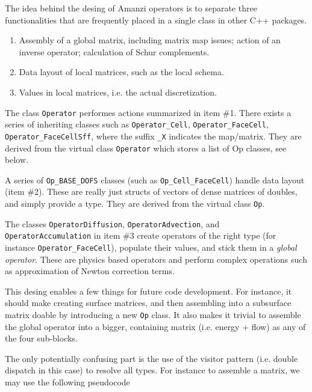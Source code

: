The idea behind the desing of Amanzi operators is to separate three 
functionalities that are frequently placed in a single class in other
C++ packages.

\begin{enumerate}
\item Assembly of a global matrix, including matrix map issues;
action of an inverse operator; calculation of Schur complements.

\item Data layout of local matrices, such as the local schema.

\item Values in local matrices, i.e. the actual discretization.
\end{enumerate}

The class {\tt Operator} performes actions summarized in item \#1. There exists
a series of inheriting classes such as {\tt Operator\_Cell}, {\tt Operator\_FaceCell}, 
{\tt Operator\_FaceCellSff}, where the suffix {\tt \_X} indicates the map/matrix.
They are derived from the virtual class {\tt Operator} which stores a list of Op classes,
see below.

A series of {\tt Op\_BASE\_DOFS} classes (such as {\tt Op\_Cell\_FaceCell})
handle data layout (item \#2). These are really just structs of vectors of
dense matrices of doubles, and simply provide a type.
They are derived from the virtual class {\tt Op}.

The classes {\tt OperatorDiffusion}, {\tt OperatorAdvection}, and {\tt OperatorAccumulation} 
in item \#3 create operators of the right type (for instance {\tt Operator\_FaceCell}), populate their 
values, and stick them in a {\it global operator}.
These are physics based operators and perform complex operations such as approximation
of Newton correction terms.

This desing enables a few things for future code development.
For instance, it should make creating surface matrices, and then assembling into a 
subsurface matrix doable by introducing a new {\tt Op} class.  
It also makes it trivial to assemble the global operator into a bigger, containing 
matrix (i.e. energy + flow) as any of the four sub-blocks.

The only potentially confusing part is the use of the visitor pattern (i.e. double dispatch 
in this case) to resolve all types.  
For instance to assemble a matrix, we may use the following pseudocode

